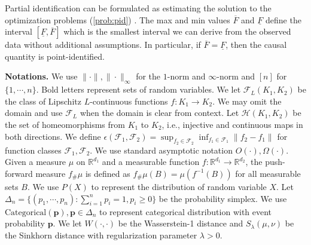 \documentclass[12pt]{article}
\theoremstyle{plain}
\theoremstyle{definition}
\theoremstyle{remark}
\begin{document}
Partial identification can be formulated as estimating the solution to the optimization problems (\ref{prob:pid}) \cite{balazadehPartialIdentificationTreatment2022}. The max and min values $ \overline{F}$ and $ \underline{F}$ define the interval $[\underline{F},\overline{F}]$ which is the smallest interval we can derive from the observed data without additional assumptions. In particular, if $ \overline{F} =\underline{F}$, then the causal quantity is point-identified.

\textbf{Notations.} We use $ \| \cdotp \|, \|\cdot\|_\infty $ for the $1$-norm and $\infty$-norm and $[n]$ for $\{1,\cdots,n\}$. Bold letters represent sets of random variables. We let $ \mathcal{F}_L(K_1,K_2)$ be the class of Lipschitz $L$-continuous functions $f:K_1\rightarrow K_2$. We may omit the domain and use  $\mathcal{F}_L$ when the domain is clear from context. Let $  \mathcal{H}(K_1,K_2) $ be the set of homeomorphisms from $K_1$ to $K_2$, i.e., injective and continuous maps in both directions. We define $ \epsilon(\mathcal{F}_1,\mathcal{F}_2)  = \sup_{f_2\in\mathcal{F}_2}\inf_{f_1\in\mathcal{F}_1} \|f_2-f_1\|$ for function classes $\mathcal{F}_1,\mathcal{F}_2$.  We use standard asymptotic notation $O(\cdot),\Omega(\cdot)$. Given a measure $ \mu $ on $ \mathbb{R}^{d_{1}}$ and a measurable function $ f:\mathbb{R}^{d_{1}}\rightarrow \mathbb{R}^{d_{2}}$, the push-forward measure $ f_{\#} \mu $ is defined as $ f_{\#} \mu ( B) =\mu \left( f^{-1}( B)\right)$ for all measurable sets $ B$. We use $P(X)$ to represent the distribution of random variable $X$. Let $\Delta_n = \{(p_1,\cdots,p_n):\sum_{i=1}^n p_i=1,p_i\geqslant 0\}$ be the probability simplex. We use $\text{Categorical}(\boldsymbol{p}),\boldsymbol{p} \in \Delta_n $ to represent categorical distribution with event probability $\boldsymbol{p}$. We let $ W(\cdot,\cdot) $ be the Wasserstein-1 distance and   $S_\lambda(\mu,\nu)$ be the Sinkhorn distance \cite{chizat2020faster} with regularization parameter $\lambda > 0 $.
\end{document}
